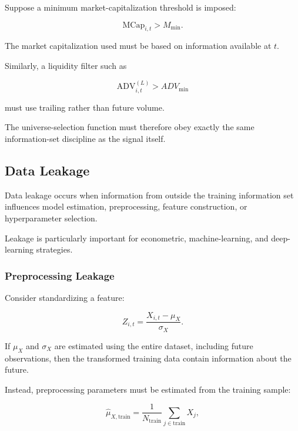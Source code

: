 \documentclass[11pt,a4paper]{article}
\begin{document}
Suppose a minimum market-capitalization threshold is imposed:

\begin{equation}
\mathrm{MCap}_{i,t}
>
M_{\min}.
\end{equation}

The market capitalization used must be based on information available at $t$.

Similarly, a liquidity filter such as

\begin{equation}
\mathrm{ADV}_{i,t}^{(L)}
>
ADV_{\min}
\end{equation}

must use trailing rather than future volume.

The universe-selection function must therefore obey exactly the same
information-set discipline as the signal itself.


\subsection{Data Leakage}
\label{subsec:data_leakage}

Data leakage occurs when information from outside the training information set
influences model estimation, preprocessing, feature construction, or
hyperparameter selection.

Leakage is particularly important for econometric, machine-learning, and
deep-learning strategies.


\subsubsection{Preprocessing Leakage}

Consider standardizing a feature:

\begin{equation}
Z_{i,t}
=
\frac{
X_{i,t}-\mu_X
}{
\sigma_X
}.
\end{equation}

If $\mu_X$ and $\sigma_X$ are estimated using the entire dataset, including
future observations, then the transformed training data contain information
about the future.

Instead, preprocessing parameters must be estimated from the training sample:

\begin{equation}
\widehat{\mu}_{X,\mathrm{train}}
=
\frac{1}{N_{\mathrm{train}}}
\sum_{j\in\mathrm{train}}
X_j,
\end{equation}
\end{document}
